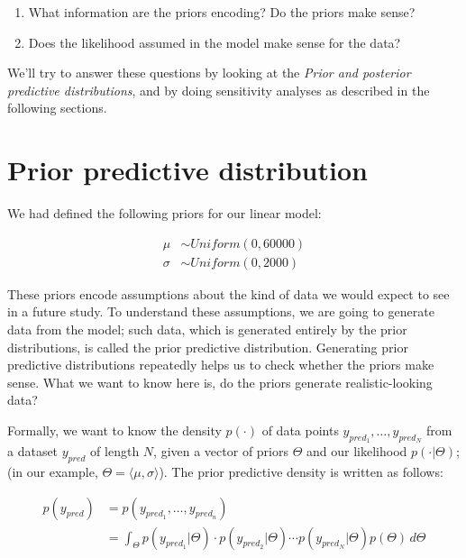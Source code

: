 \documentclass[12pt,]{krantz}
\providecommand{\tightlist}{%
  \setlength{\itemsep}{0pt}\setlength{\parskip}{0pt}}
\theoremstyle{definition}
\theoremstyle{definition}
\theoremstyle{definition}
\theoremstyle{remark}
\begin{document}
\begin{enumerate}
\def\labelenumi{\arabic{enumi}.}
\tightlist
\item
  What information are the priors encoding? Do the priors make sense?
\item
  Does the likelihood assumed in the model make sense for the data?
\end{enumerate}

We'll try to answer these questions by looking at the \emph{Prior and posterior predictive distributions}, and by doing sensitivity analyses as described in the following sections.

\hypertarget{sec:priorpred}{%
\section{Prior predictive distribution}\label{sec:priorpred}}

We had defined the following priors for our linear model:

\begin{equation}
\begin{aligned}
\mu &\sim Uniform(0, 60000) \\
\sigma &\sim Uniform(0, 2000) 
\label{eq:rtpriorsrepeated}
\end{aligned}
\end{equation}

These priors encode assumptions about the kind of data we would expect to see in a future study.
To understand these assumptions, we are going to generate data from the model; such data, which is generated entirely by the prior distributions, is called the prior predictive distribution. Generating prior predictive distributions repeatedly helps us to check whether the priors make sense. What we want to know here is, do the priors generate realistic-looking data?

Formally, we want to know the density \(p(\cdot)\) of data points \(y_{pred_1},\dots,y_{pred_N}\) from a dataset \(y_{pred}\) of length \(N\), given a vector of priors \(\Theta\) and our likelihood \(p(\cdot|\Theta)\); (in our example, \(\Theta=\langle\mu,\sigma \rangle\)). The prior predictive density is written as follows:

\begin{equation}
\begin{aligned}
p(y_{pred}) &= p(y_{pred_1},\dots,y_{pred_n})\\
&= \int_\Theta p(y_{pred_1}|\Theta)\cdot p(y_{pred_2}|\Theta)\cdots p(y_{pred_N}|\Theta) p(\Theta) \, d\Theta 
\end{aligned}
\end{equation}
\end{document}
